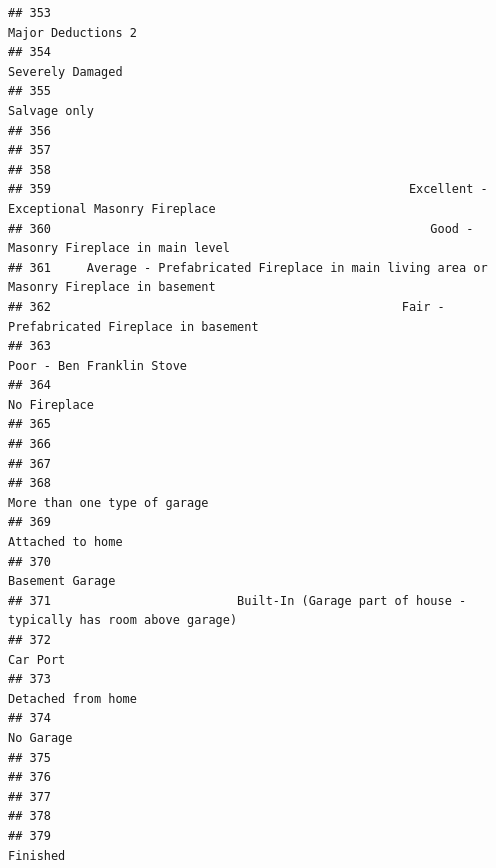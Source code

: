 \documentclass[
]{article}
\begin{document}
\begin{verbatim}
## 353                                                                         Major Deductions 2
## 354                                                                           Severely Damaged
## 355                                                                               Salvage only
## 356                                                                                           
## 357                                                                                           
## 358                                                                                           
## 359                                                  Excellent - Exceptional Masonry Fireplace
## 360                                                     Good - Masonry Fireplace in main level
## 361     Average - Prefabricated Fireplace in main living area or Masonry Fireplace in basement
## 362                                                 Fair - Prefabricated Fireplace in basement
## 363                                                                  Poor - Ben Franklin Stove
## 364                                                                               No Fireplace
## 365                                                                                           
## 366                                                                                           
## 367                                                                                           
## 368                                                               More than one type of garage
## 369                                                                           Attached to home
## 370                                                                            Basement Garage
## 371                          Built-In (Garage part of house - typically has room above garage)
## 372                                                                                   Car Port
## 373                                                                         Detached from home
## 374                                                                                  No Garage
## 375                                                                                           
## 376                                                                                           
## 377                                                                                           
## 378                                                                                           
## 379                                                                                   Finished

\end{verbatim}
\end{document}

